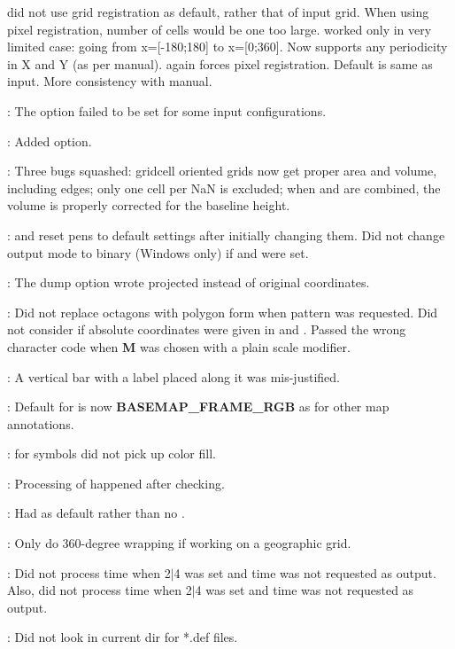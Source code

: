 \begin{description}
 did not use grid registration as default, rather that of input grid.
When using pixel registration, number of cells would be one too large.
 worked only in very limited case: going from x=[-180;180] to x=[0;360].
Now supports any periodicity in X and Y (as per manual).  again forces pixel registration.
Default is same as input.  More consistency with manual.
\item [\GMTprog{grdtrack}]: The  option failed to be set for some input configurations.
\item [\GMTprog{grdvector}]: Added  option.
\item [\GMTprog{grdvolume}]: Three bugs squashed: gridcell oriented grids now get proper area and volume,
including edges; only one cell per NaN is excluded; when  and  are combined,
the volume is properly corrected for the baseline height.
\item [\GMTprog{pscoast}]:  and  reset pens to default settings after initially changing them.
Did not change output mode to binary (Windows only) if  and  were set.
\item [\GMTprog{pscontour}]: The  dump option wrote projected instead of original coordinates.
\item [\GMTprog{pslegend}]: Did not replace octagons with polygon form when pattern was requested.
Did not consider if absolute coordinates were given in  and . Passed the wrong character code
when {\bf M} was chosen with a plain scale modifier.
\item [\GMTprog{psscale}]: A vertical bar with a label placed along it was mis-justified.
\item [\GMTprog{pstext}]: Default for  is now {\bf BASEMAP\_FRAME\_RGB} as for other map annotations.
\item [\GMTprog{psxyz}]:  for symbols did not pick up color fill.
\item [\GMTprog{trend2d}]: Processing of  happened after checking.
\item [\GMTprog{xyz2grd}]: Had  as default rather than no .
\item [\GMTprog{dbase/grdraster}]: Only do 360-degree wrapping if working on a geographic grid.
\item [\GMTprog{mgd77/mgd77list}]: Did not process time when 2$|$4 was set and time was not requested as output.
Also, did not process time when 2$|$4 was set and time was not requested as output.
\item [\GMTprog{x2sys/x2sys}]: Did not look in current dir for *.def files.
\end{description}

